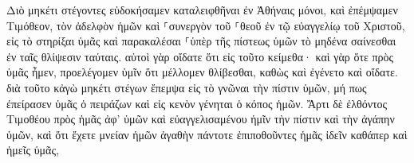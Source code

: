 \documentclass{openreader}
\begin{document}
Διὸ μηκέτι στέγοντες εὐδοκήσαμεν καταλειφθῆναι ἐν Ἀθήναις μόνοι, 
καὶ ἐπέμψαμεν Τιμόθεον, τὸν ἀδελφὸν ἡμῶν καὶ ⸀συνεργὸν τοῦ ⸀θεοῦ ἐν τῷ εὐαγγελίῳ τοῦ Χριστοῦ, εἰς τὸ στηρίξαι ὑμᾶς καὶ παρακαλέσαι ⸀ὑπὲρ τῆς πίστεως ὑμῶν 
τὸ μηδένα σαίνεσθαι ἐν ταῖς θλίψεσιν ταύταις. αὐτοὶ γὰρ οἴδατε ὅτι εἰς τοῦτο κείμεθα· 
καὶ γὰρ ὅτε πρὸς ὑμᾶς ἦμεν, προελέγομεν ὑμῖν ὅτι μέλλομεν θλίβεσθαι, καθὼς καὶ ἐγένετο καὶ οἴδατε. 
διὰ τοῦτο κἀγὼ μηκέτι στέγων ἔπεμψα εἰς τὸ γνῶναι τὴν πίστιν ὑμῶν, μή πως ἐπείρασεν ὑμᾶς ὁ πειράζων καὶ εἰς κενὸν γένηται ὁ κόπος ἡμῶν. 
Ἄρτι δὲ ἐλθόντος Τιμοθέου πρὸς ἡμᾶς ἀφ’ ὑμῶν καὶ εὐαγγελισαμένου ἡμῖν τὴν πίστιν καὶ τὴν ἀγάπην ὑμῶν, καὶ ὅτι ἔχετε μνείαν ἡμῶν ἀγαθὴν πάντοτε ἐπιποθοῦντες ἡμᾶς ἰδεῖν καθάπερ καὶ ἡμεῖς ὑμᾶς, 
\end{document}
